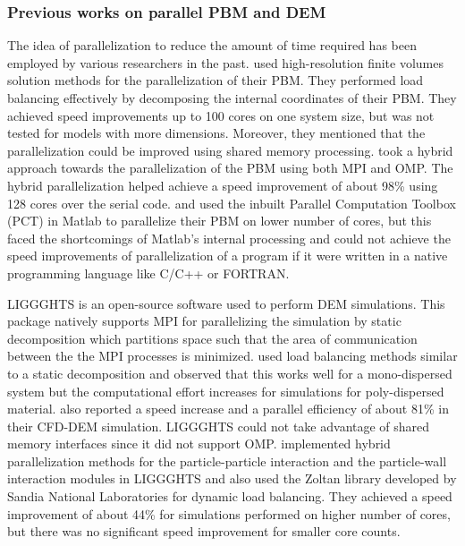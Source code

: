 \documentclass[preprint,11pt,authoryear]{elsarticle}
\begin{document}
\subsubsection{Previous works on parallel PBM and DEM}
The idea of parallelization to reduce the amount of time required has been employed by various 
researchers in the past. \cite{Gunawan2008} used high-resolution finite volumes solution methods for 
the parallelization of their PBM. They performed load balancing effectively by 
decomposing the internal coordinates of their PBM. They achieved speed improvements up to 100 
cores on one system size, but was not tested for models with more dimensions. Moreover, they 
mentioned that the parallelization could be improved using shared memory processing. 
\cite{Bettencourt2017} took a hybrid approach towards the parallelization of the PBM using both 
MPI and OMP. The hybrid parallelization helped achieve 
a speed improvement of about 98\% using 128 cores over the serial code. \cite{Prakash2013a} and \cite{Prakash2013b} 
used the inbuilt Parallel Computation Toolbox (PCT) in Matlab \citep{pctMatlab} to parallelize their PBM on lower number 
of cores, but this faced the shortcomings of Matlab's internal processing and could not achieve the 
speed improvements of parallelization of a program if it were written in a native programming language 
like C/C++ or FORTRAN. 

LIGGGHTS is an open-source software used to perform DEM simulations. This package natively 
supports MPI for parallelizing the simulation by static decomposition which partitions space such that 
the area of communication between the the MPI processes is minimized. \cite{kacianauskas2010} used 
load balancing methods similar to a static decomposition and observed that this works well for a 
mono-dispersed system but the computational effort increases for simulations for poly-dispersed 
material. \cite{Gopalakrishnan2013} also reported a speed increase and a parallel efficiency of about 
81\% in their CFD-DEM simulation. LIGGGHTS could not take advantage of shared memory interfaces 
since it did not support OMP. \cite{Berger2015} implemented hybrid parallelization methods for the 
particle-particle interaction and the particle-wall interaction modules in LIGGGHTS and also used the 
Zoltan library \citep{Boman2012} developed by Sandia National Laboratories for dynamic load 
balancing. They achieved a speed improvement of about 44\% for simulations performed on higher 
number of cores, but there was no significant speed improvement for smaller core counts. 
\end{document}
